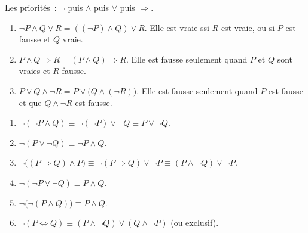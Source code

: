 
Les priorit\'es~: $\lnot$ puis $\land$ puis $\lor$ puis $\Rightarrow$.

\begin{enumerate}
  \item $\lnot P\land Q\lor R=((\lnot P)\land Q)\lor R$.
        Elle est vraie ssi $R$ est vraie, ou si $P$ est fausse et $Q$ vraie.
  \item $P\land Q\Rightarrow R=(P\land Q)\Rightarrow R$.
        Elle est fausse seulement quand $P$ et $Q$ sont vraies et $R$ fausse.
  \item $P\lor Q\land\lnot R=P\lor\bigl(Q\land(\lnot R)\bigr)$.
        Elle est fausse seulement quand $P$ est fausse et que $Q\land\lnot R$ est fausse.
\end{enumerate}


\begin{enumerate}
  \item $\lnot(\lnot P\land Q)\equiv\lnot(\lnot P)\lor\lnot Q\equiv P\lor\lnot Q$.
  \item $\lnot(P\lor\lnot Q)\equiv\lnot P\land Q$.
  \item $\lnot\bigl((P\Rightarrow Q)\land P\bigr)
        \equiv\lnot(P\Rightarrow Q)\lor\lnot P
        \equiv(P\land\lnot Q)\lor\lnot P$.
  \item $\lnot(\lnot P\lor\lnot Q)\equiv P\land Q$.
  \item $\lnot\bigl(\lnot(P\land Q)\bigr)\equiv P\land Q$.
  \item $\lnot(P\Leftrightarrow Q)
        \equiv(P\land\lnot Q)\lor(Q\land\lnot P)$ (ou exclusif).
\end{enumerate}


